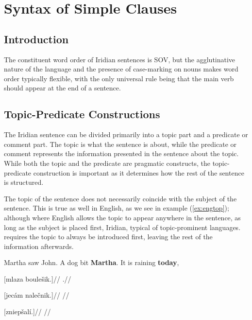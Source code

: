 \chapter{Syntax of Simple Clauses}

\section{Introduction}

The constituent word order of Iridian sentences is SOV, but the agglutinative nature of the language and the presence of case-marking on nouns makes word order typically flexible, with the only universal rule being that the main verb should appear at the end of a sentence.

\section{Topic-Predicate Constructions}
The Iridian sentence can be divided primarily into a topic part and a predicate
or comment part. The topic is what the sentence is about, while the predicate or comment represents the information presented in the sentence about the topic. While both the topic and the predicate are pragmatic constructs, the topic-predicate construction is important as it determines how the rest of the sentence is structured.

The topic of the sentence does not necessarily coincide with the subject of the sentence. This is true as well in English, as we see in example (\ref{ex:engtop}); although where English allows the topic to appear anywhere in the sentence, as long as the subject is placed first, Iridian, typical of topic-prominent languages. requires the topic to always be introduced first, leaving the rest of the information afterwards.


\pex\label{ex:engtop}
\a Martha saw John.
\a A dog bit \textbf{Martha}.
\a It is raining \textbf{today},
\xe


\pex
\a
\begingl
\gla \relax[Janek] [mlaza boule\v{s}ik.]//
\glft {}.//
\endgl

\a
\begingl
\gla \relax[Tereza] [jec\'am nale\v{c}nik.]//
\glft {}//
\endgl

\a
\begingl
\gla \relax[Shl\'ed] [zniep\v{s}al\'i.]//
\glft {}//
\endgl

